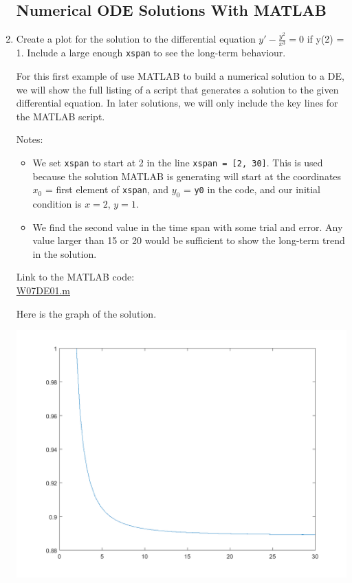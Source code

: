 \begin{enumerate}
\hrulefill

\subsection*{Numerical ODE Solutions With MATLAB}


\item
\begin{Question}
  Create a plot for the solution to the differential equation
  $y' - \frac{y^2}{x^3} = 0$ if y(2) = 1.  Include a large enough
  \verb#xspan# to see the long-term behaviour.
\end{Question}

\begin{Solution}
  For this first example of use MATLAB to build a numerical solution
  to a DE, we will show the full listing of a script that generates a
  solution to the given differential equation.  In later solutions, we
  will only include the key lines for the MATLAB script.

  Notes: 
  \begin{itemize}
  \item We set \verb#xspan# to start at 2 in the line
    \verb#xspan = [2, 30]#.  This is used because the solution MATLAB
    is generating will start at the coordinates $x_0$ = first element
    of \verb#xspan#, and $y_0$ = \verb#y0# in the code, and our
    initial condition is $x = 2$, $y=1$.
  \item We find the second value in the time span with some trial and
    error.  Any value larger than 15 or 20 would be sufficient to show
    the long-term trend in the solution.
  \end{itemize}


Link to the MATLAB code: \\
\href{http://www.mast.queensu.ca/~apsc171/MNTCP01/PracticeProblems/MATLAB/W07DE01.m}{W07DE01.m}

Here is the graph of the solution.

\includegraphics[width = 0.5\linewidth]{graphics/Week07_DESolutions/W07DE01}


\end{Solution}
\end{enumerate}
